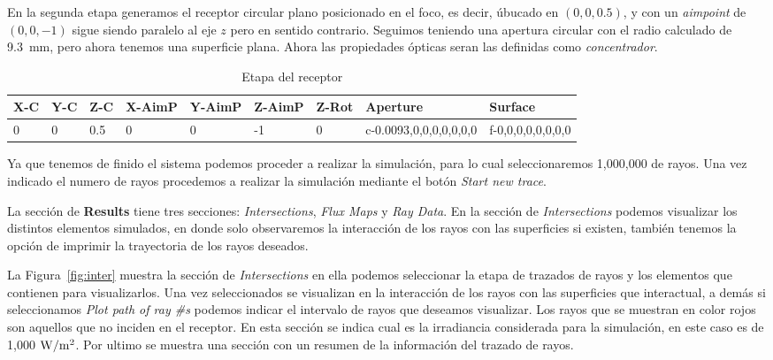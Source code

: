 En la segunda etapa generamos el receptor circular plano posicionado en el foco, es decir, úbucado en $(0, 0, 0.5)$, y con un \emph{aimpoint} de $(0, 0, -1)$ sigue siendo paralelo al eje $z$ pero en sentido contrario. Seguimos teniendo una apertura circular con el radio calculado de 9.3~mm, pero ahora tenemos una superficie plana. Ahora las propiedades ópticas seran las definidas como \emph{concentrador}.

\begin{table}[h]
  \centering
  \scriptsize
  \begin{tabular}[h]{lllllllll}
    \toprule
    X-C & Y-C & Z-C & X-AimP & Y-AimP & Z-AimP & Z-Rot & Aperture & Surface\\
    \midrule
    0 & 0 & 0.5 & 0 & 0 & -1 & 0 & c-0.0093,0,0,0,0,0,0,0 & f-0,0,0,0,0,0,0,0\\
    \bottomrule
  \end{tabular}
  \caption{\label{tab:etapaReceptorR} Etapa del receptor }
\end{table}

Ya que tenemos de finido el sistema podemos proceder a realizar la simulación, para lo cual seleccionaremos 1,000,000 de rayos. Una vez indicado el numero de rayos procedemos a realizar la simulación mediante el botón \emph{Start new trace}.

La sección de \textbf{Results} tiene tres secciones: \emph{Intersections}, \emph{Flux Maps} y \emph{Ray Data}. En la sección de \emph{Intersections} podemos visualizar los distintos elementos simulados, en donde solo observaremos la interacción de los rayos con las superficies si existen, también tenemos la opción de imprimir la trayectoria de los rayos deseados.

La Figura~\ref{fig:inter} muestra la sección de \emph{Intersections} en ella podemos seleccionar la etapa de trazados de rayos y los elementos que contienen para visualizarlos. Una vez seleccionados se visualizan en la interacción de los rayos con las superficies que interactual, a demás si seleccionamos \emph{Plot path of ray \#s} podemos indicar el intervalo de rayos que deseamos visualizar. Los rayos que se muestran en color rojos son aquellos que no inciden en el receptor. En esta sección se indica cual es la irradiancia considerada para la simulación, en este caso es de 1,000 $\rm W/m^2$. Por ultimo se muestra una sección  con un resumen de la información del trazado de rayos.

